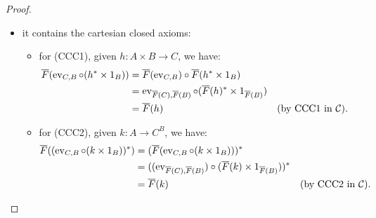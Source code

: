 \begin{proof}
\begin{itemize}
\begin{itemize}[label=$\ast$]
\begin{align*}
                &= \pi_{\overline F(A),\overline F(B)} \circ \langle \overline F(f), \overline F(g)\rangle &&(\textnormal{by cartesian closedness}) \\
                &= \overline F(f) &&(\textnormal{by CC2a in $\mathcal C$});
            \end{align*}
            \item similarly for (CC2b);
            \item for (CC2c), given $h : C \to A \times B$, we have:
            \begin{align*}
                \overline F(\langle \pi_{A,B} \circ h, \pi_{A,B}' \circ h\rangle) &= \langle \overline F(\pi_{A,B}) \circ \overline F(h), \overline F(\pi_{A,B}') \circ \overline F(h)\rangle \\
                                                                                  &= \langle \pi_{\overline F(A),\overline F(B)} \circ \overline F(h), \pi_{\overline F(A),\overline F(B)}' \circ \overline F(h)\rangle \\
                                                                                  &= \overline F(h) &&(\textnormal{by CC2c in $\mathcal C$});
            \end{align*}
        \end{itemize}
        \item it contains the cartesian closed axioms:
        \begin{itemize}[label=$\ast$]
            \item for (CCC1), given $h : A \times B \to C$, we have:
            \begin{align*}
                \overline F(\operatorname{ev}_{C,B} \circ (h^* \times 1_B)) &= \overline F(\operatorname{ev}_{C,B}) \circ \overline F(h^* \times 1_B) \\
                                                              &= \operatorname{ev}_{\overline F(C),\overline F(B)} \circ (\overline F(h)^* \times 1_{\overline F(B)}) \\
                                                              &= \overline F(h) &&(\textnormal{by CCC1 in $\mathcal C$}).
            \end{align*}
            \item for (CCC2), given $k : A \to C^B$, we have:
            \begin{align*}
                \overline F((\operatorname{ev}_{C,B} \circ (k \times 1_B))^*) &= (\overline F(\operatorname{ev}_{C,B} \circ (k \times 1_B)))^* \\
                                                                 &= ((\operatorname{ev}_{\overline F(C),\overline F(B)}) \circ (\overline F(k) \times 1_{\overline F(B)}))^* \\
                                                                 &= \overline F(k) &&(\textnormal{by CCC2 in $\mathcal C$}).
            \end{align*}
        \end{itemize}
    \end{itemize}
\end{proof}


